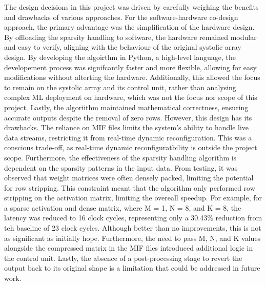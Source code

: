 \documentclass[12pt, a4paper, ukenglish]{article}
\begin{document}
    The design decisions in this project was driven by carefully weighing the benefits and drawbacks of various approaches. For the software-hardware co-design approach, the primary advantage was the simplification of the hardware design. By offloading the sparsity handling to software, the hardware remained modular and easy to verify, aligning with the behaviour of the original systolic array design. By developing the algoirthm in Python, a high-level language, the developement process was signifcantly faster and more flexible, allowing for easy modifications without alterting the hardware. Additionally, this allowed the focus to remain on the systolic array and its control unit, rather than analysing complex ML deployment on hardware, which was not the focus nor scope of this project. Lastly, the algoriithm maintained mathematical correctness, ensuring accurate outputs despite the removal of zero rows. 
    However, this design has its drawbacks. The reliance on MIF files limits the system's ability to handle live data streams, restricting it from real-time dynamic reconfiguration. This was a conscious trade-off, as real-time dynamic reconfiguratbility is outside the project scope. Furthermore, the effectiveness of the sparsity handling algorithm is dependent on the sparsity patterns in the input data. From testing, it was observed that weight matrices were often densely packed, limiting the potential for row stripping. This constraint meant that the algorithm only performed row stripping on the activation matrix, limiting the overeall speedup. For example, for a sparse activation and dense matrix, where M = 1, N = 8, and K = 8, the latency was reduced to 16 clock cycles, representing only a 30.43\% reduction from teh baseline of 23 clock cycles. Although better than no improvements, this is not as significant as initially hope. Furthermore, the need to pass M, N, and K values alongside the compressed matrix in the MIF files introduced additional logic in the control unit. Lastly, the absence of a post-processing stage to revert the output back to its original shape is a limitation that could be addressed in future work.
    
\end{document}
